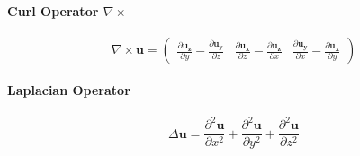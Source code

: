 \documentclass[a4paper, 9pt]{extarticle}
\begin{document}
\paragraph{Curl Operator $\nabla \times$}
\begin{equation}
    \nabla \times \mathbf{u} = \begin{pmatrix}
        \frac{\partial \mathbf{u_z}}{\partial y} - \frac{\partial \mathbf{u_y}}{\partial z} &
        \frac{\partial \mathbf{u_x}}{\partial z} - \frac{\partial \mathbf{u_z}}{\partial x} &
        \frac{\partial \mathbf{u_y}}{\partial x} - \frac{\partial \mathbf{u_x}}{\partial y}
    \end{pmatrix}
\end{equation}

\paragraph{Laplacian Operator}
\begin{equation}
    \Delta \mathbf{u} = \frac{\partial^2 \mathbf{u}}{\partial x^2} + \frac{\partial^2 \mathbf{u}}{\partial y^2} + \frac{\partial^2 \mathbf{u}}{\partial z^2}
\end{equation}
\end{document}
